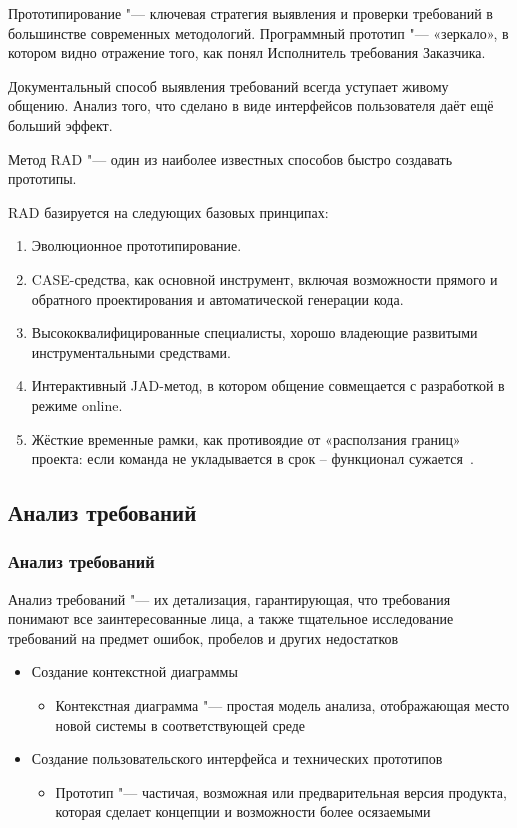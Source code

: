 \documentclass{../industrial-development}
\begin{document}
Прототипирование "--- ключевая стратегия выявления и проверки требований в большинстве современных методологий. Программный прототип "--- «зеркало», в котором видно отражение того, как понял Исполнитель требования Заказчика. 

Документальный способ выявления требований всегда уступает живому общению. Анализ того, что сделано в виде интерфейсов пользователя даёт ещё больший эффект. 

Метод RAD "--- один из наиболее известных способов быстро создавать прототипы.

RAD базируется на следующих базовых принципах:
\begin{enumerate}
\item Эволюционное прототипирование.
\item CASE-средства, как основной инструмент, включая возможности прямого и
обратного проектирования и автоматической генерации кода.
\item Высококвалифицированные специалисты, хорошо владеющие развитыми
инструментальными средствами.
\item Интерактивный JAD-метод, в котором общение совмещается с разработкой
в режиме online.
\item Жёсткие временные рамки, как противоядие от «расползания границ» проекта: если команда не укладывается в срок – функционал сужается~\cite[с.~33--34]{Maglinec}.
\end{enumerate}


\subsection{Анализ требований}
\begin{frame} \frametitle{Анализ требований}
  \begin{block}{}
   \alert{Анализ требований} "--- их детализация, гарантирующая, что требования понимают все заинтересованные лица, а также тщательное исследование требований на предмет ошибок, пробелов и других недостатков
  \end{block}
	
\begin{itemize}
\item \alert{Создание контекстной диаграммы} 
\begin{itemize}
\item Контекстная диаграмма "--- простая модель анализа, отображающая место новой системы в соответствующей среде
\end{itemize}
\item \alert{Создание пользовательского интерфейса и технических прототипов} 
\begin{itemize}
\item Прототип "--- частичая, возможная или предварительная версия продукта, которая сделает концепции и возможности более осязаемыми
\end{itemize}
\end{itemize}
\end{frame}
\end{document}
